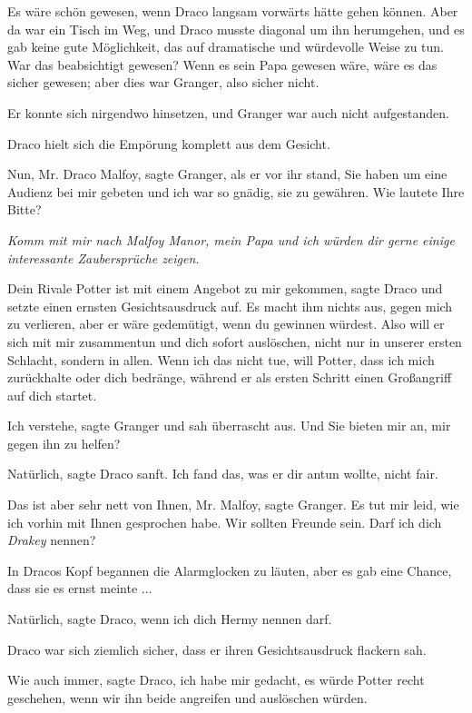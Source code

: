 Es wäre schön gewesen, wenn Draco langsam vorwärts hätte gehen können. Aber da
war ein Tisch im Weg, und Draco musste diagonal um ihn herumgehen, und es gab
keine gute Möglichkeit, das auf dramatische und würdevolle Weise zu tun. War das
beabsichtigt gewesen? Wenn es sein Papa gewesen wäre, wäre es das sicher
gewesen; aber dies war Granger, also sicher nicht.

Er konnte sich nirgendwo hinsetzen, und Granger war auch nicht aufgestanden.

Draco hielt sich die Empörung komplett aus dem Gesicht.

\glqq{}Nun, Mr. Draco Malfoy\grqq{}, sagte Granger, als er vor ihr stand,
\glqq{}Sie haben um eine Audienz bei mir gebeten und ich war so gnädig, sie zu
gewähren. Wie lautete Ihre Bitte?\grqq{}

\emph{Komm mit mir nach Malfoy Manor, mein Papa und ich würden dir gerne einige
interessante Zaubersprüche zeigen.}

\glqq{}Dein Rivale Potter ist mit einem Angebot zu mir gekommen\grqq{}, sagte
Draco und setzte einen ernsten Gesichtsausdruck auf. \glqq{}Es macht ihm nichts
aus, gegen mich zu verlieren, aber er wäre gedemütigt, wenn du gewinnen würdest.
Also will er sich mit mir zusammentun und dich sofort auslöschen, nicht nur in
unserer ersten Schlacht, sondern in allen. Wenn ich das nicht tue, will Potter,
dass ich mich zurückhalte oder dich bedränge, während er als ersten Schritt
einen Großangriff auf dich startet.\grqq{}

\glqq{}Ich verstehe\grqq{}, sagte Granger und sah überrascht aus. \glqq{}Und Sie
bieten mir an, mir gegen ihn zu helfen?\grqq{}

\glqq{}Natürlich\grqq{}, sagte Draco sanft. \glqq{}Ich fand das, was er dir
antun wollte, nicht fair.\grqq{}

\glqq{}Das ist aber sehr nett von Ihnen, Mr. Malfoy\grqq{}, sagte Granger.
\glqq{}Es tut mir leid, wie ich vorhin mit Ihnen gesprochen habe. Wir sollten
Freunde sein. Darf ich dich \emph{Drakey} nennen?\grqq{}

In Dracos Kopf begannen die Alarmglocken zu läuten, aber es gab eine Chance,
dass sie es ernst meinte ...

\glqq{}Natürlich\grqq{}, sagte Draco, \glqq{}wenn ich dich Hermy nennen
darf.\grqq{}

Draco war sich ziemlich sicher, dass er ihren Gesichtsausdruck flackern sah.

\glqq{}Wie auch immer\grqq{}, sagte Draco, \glqq{}ich habe mir gedacht, es würde
Potter recht geschehen, wenn wir ihn beide angreifen und auslöschen
würden.\grqq{}

